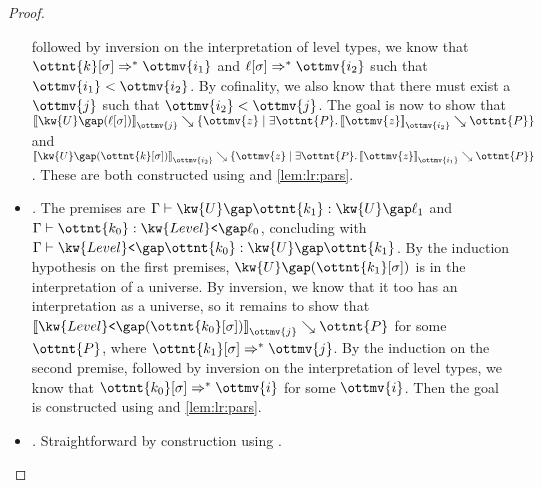 \documentclass[a4paper,UKenglish,cleveref,autoref,thm-restate]{lipics-v2021}
\begin{document}
\begin{proof}
\begin{itemize}[topsep=0pt]
      followed by inversion on the interpretation of level types,
      we know that $  \ottnt{k} [  \sigma  ]   \Rightarrow^\ast   \ottmv{i_{{\mathrm{1}}}}  $ and $  \ell [  \sigma  ]   \Rightarrow^\ast   \ottmv{i_{{\mathrm{2}}}}  $ such that $ \ottmv{i_{{\mathrm{1}}}}  <  \ottmv{i_{{\mathrm{2}}}} $.
      By cofinality, we also know that there must exist a $\ottmv{j}$ such that $ \ottmv{i_{{\mathrm{2}}}}  <  \ottmv{j} $.
      The goal is now to show that $ \mathopen{\llbracket}   \kw{U} \gap   (  \ell [  \sigma  ]  )    \mathclose{\rrbracket}_{ \ottmv{j} } \searrow   \lbrace  \ottmv{z}  \mid   \exists  \ottnt{P}  \mathpunct{.}   \mathopen{\llbracket}   \mathit{ \ottmv{z} }   \mathclose{\rrbracket}_{ \ottmv{i_{{\mathrm{2}}}} } \searrow  \ottnt{P}    \rbrace  $
      and $ \mathopen{\llbracket}   \kw{U} \gap   (  \ottnt{k} [  \sigma  ]  )    \mathclose{\rrbracket}_{ \ottmv{i_{{\mathrm{2}}}} } \searrow   \lbrace  \ottmv{z}  \mid   \exists  \ottnt{P}  \mathpunct{.}   \mathopen{\llbracket}   \mathit{ \ottmv{z} }   \mathclose{\rrbracket}_{ \ottmv{i_{{\mathrm{1}}}} } \searrow  \ottnt{P}    \rbrace  $.
      These are both constructed using  and \cref{lem:lr:pars}.
    \item \textit{.}
      The premises are $ \Gamma  \vdash   \kw{U} \gap  \ottnt{k_{{\mathrm{1}}}}   \mathrel{:}   \kw{U} \gap  \ell_{{\mathrm{1}}}  $ and $ \Gamma  \vdash  \ottnt{k_{{\mathrm{0}}}}  \mathrel{:}   \kw{Level}\texttt{<} \gap  \ell_{{\mathrm{0}}}  $,
      concluding with $ \Gamma  \vdash   \kw{Level}\texttt{<} \gap  \ottnt{k_{{\mathrm{0}}}}   \mathrel{:}   \kw{U} \gap  \ottnt{k_{{\mathrm{1}}}}  $.
      By the induction hypothesis on the first premises,
      $ \kw{U} \gap   (  \ottnt{k_{{\mathrm{1}}}} [  \sigma  ]  )  $ is in the interpretation of a universe.
      By inversion, we know that it too has an interpretation as a universe,
      so it remains to show that $ \mathopen{\llbracket}   \kw{Level}\texttt{<} \gap   (  \ottnt{k_{{\mathrm{0}}}} [  \sigma  ]  )    \mathclose{\rrbracket}_{ \ottmv{j} } \searrow  \ottnt{P} $ for some $\ottnt{P}$,
      where $  \ottnt{k_{{\mathrm{1}}}} [  \sigma  ]   \Rightarrow^\ast   \ottmv{j}  $.
      By the induction on the second premise,
      followed by inversion on the interpretation of level types,
      we know that $  \ottnt{k_{{\mathrm{0}}}} [  \sigma  ]   \Rightarrow^\ast   \ottmv{i}  $ for some $\ottmv{i}$.
      Then the goal is constructed using  and \cref{lem:lr:pars}.
    \item \textit{.} Straightforward by construction using .

\end{itemize}
\end{proof}
\end{document}
